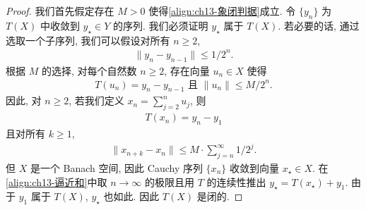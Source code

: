 \documentclass[../../main.tex]{subfiles}
\begin{document}
\begin{proof}
我们首先假定存在 $M>0$ 使得\eqref{align:ch13-象闭判据}成立. 令 $\{y_{n}\}$ 为 $T(X)$ 中收敛到 $y_{\star}\in Y$ 的序列. 我们必须证明 $y_{\star}$ 属于 $T(X)$. 若必要的话, 通过选取一个子序列, 我们可以假设对所有 $n\geqslant 2$,
\begin{align*}
\|y_{n}-y_{n-1}\|\leqslant 1/2^{n}.
\end{align*}
根据 $M$ 的选择, 对每个自然数 $n\geqslant 2$, 存在向量 $u_{n}\in X$ 使得
\begin{align*}
T(u_{n})=y_{n}-y_{n-1}\text{ 且 }\|u_{n}\|\leqslant M/2^{n}.
\end{align*}
因此, 对 $n\geqslant 2$, 若我们定义 $x_{n}=\sum_{j=2}^{n}u_{j}$, 则
\begin{align}
T(x_{n})=y_{n}-y_{1}\label{align:ch13-逼近和}
\end{align}
且对所有 $k\geqslant 1$,
\begin{align}
\|x_{n+k}-x_{n}\|\leqslant M\cdot\sum_{j=n}^{\infty}1/2^{j}.\label{align:ch13-Cauchy}
\end{align}
但 $X$ 是一个 Banach 空间, 因此 Cauchy 序列 $\{x_{n}\}$ 收敛到向量 $x_{\star}\in X$. 在\eqref{align:ch13-逼近和}中取 $n\to\infty$ 的极限且用 $T$ 的连续性推出 $y_{\star}=T(x_{\star})+y_{1}$. 由于 $y_{1}$ 属于 $T(X)$, $y_{\star}$ 也如此. 因此 $T(X)$ 是闭的.


\end{proof}
\end{document}
